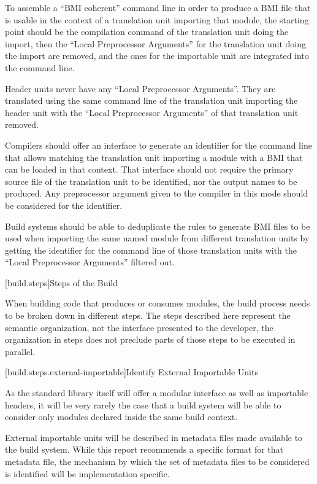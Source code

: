 \pnum To assemble a ``BMI coherent'' command line in order to produce
a BMI file that is usable in the context of a translation unit
importing that module, the starting point should be the compilation
command of the translation unit doing the import, then the ``Local
Preprocessor Arguments'' for the translation unit doing the import are
removed, and the ones for the importable unit are integrated into the
command line.

\pnum Header units never have any ``Local Preprocessor
Arguments''. They are translated using the same command line of the
translation unit importing the header unit with the ``Local
Preprocessor Arguments'' of that translation unit removed.

\pnum Compilers should offer an interface to generate an identifier
for the command line that allows matching the translation unit
importing a module with a BMI that can be loaded in that context. That
interface should not require the primary source file of the
translation unit to be identified, nor the output names to be
produced. Any preprocessor argument given to the compiler in this mode
should be considered for the identifier.

\pnum Build systems should be able to deduplicate the rules to
generate BMI files to be used when importing the same named module
from different translation units by getting the identifier for the
command line of those translation units with the ``Local Preprocessor
Arguments'' filtered out.

[build.steps]{Steps of the Build}

\pnum When building \Cpp{} code that produces or consumes modules, the
build process needs to be broken down in different steps. The steps
described here represent the semantic organization, not the interface
presented to the \Cpp{} developer, the organization in steps does not
preclude parts of those steps to be executed in parallel.

[build.steps.external-importable]{Identify External Importable Units}

\pnum As the \Cpp{} standard library itself will offer a modular
interface as well as importable headers, it will be very rarely the
case that a build system will be able to consider only modules
declared inside the same build context.

\pnum External importable units will be described in metadata files
made available to the build system. While this report recommends a
specific format for that metadata file, the mechanism by which the set
of metadata files to be considered is identified will be
implementation specific.

